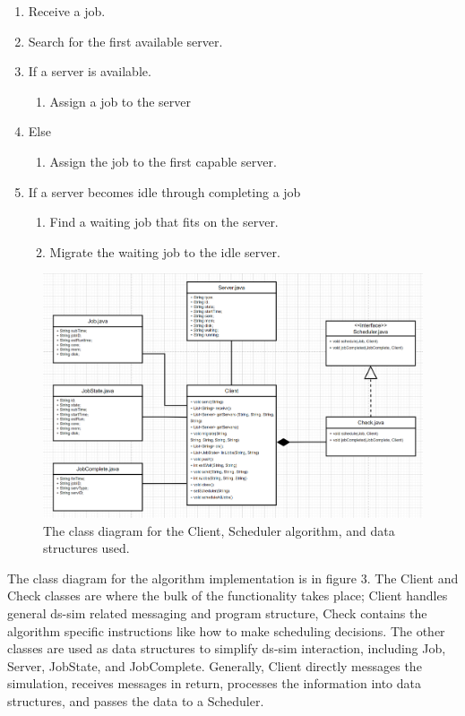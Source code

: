 \documentclass[a4paper]{article} %
\begin{document}
\begin{enumerate}
    \item Receive a job.
    \item Search for the first available server.
    \item If a server is available.
        \begin{enumerate}
            \item Assign a job to the server 
        \end{enumerate}
    \item Else
        \begin{enumerate}
            \item Assign the job to the first capable server.
        \end{enumerate}
    \item If a server becomes idle through completing a job
        \begin{enumerate}
            \item Find a waiting job that fits on the server.
            \item Migrate the waiting job to the idle server.
        \end{enumerate}
\end{enumerate}

\begin{figure}
    \centering
    \includegraphics[scale=0.7]{class.png}
    \caption{The class diagram for the Client, Scheduler algorithm, and data structures used.}
    \label{fig:class}
\end{figure}


The class diagram for the algorithm implementation is in figure 3. The Client and Check classes are where the bulk of the functionality takes place; Client handles general ds-sim related messaging and program structure, Check contains the algorithm specific instructions like how to make scheduling decisions. The other classes are used as data structures to simplify ds-sim interaction, including Job, Server, JobState, and JobComplete. Generally, Client directly messages the simulation, receives messages in return, processes the information into data structures, and passes the data to a Scheduler.\par
\end{document}
